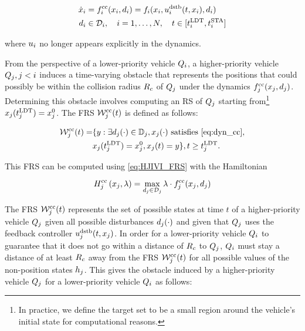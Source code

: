 \begin{equation}
\label{eq:dyn_cc}
\begin{aligned}
\dot \state_i &= \fdyn^\text{cc}_i (\state_i, \dstb_i) = \fdyn_i(\state_i, \ctrl^\text{dstb}_i(t,\state_i), \dstb_i) \\
\dstb_i &\in \dset_i, \quad i = 1,\ldots, N, \quad t \in [\ldt_i, \sta_i]
\end{aligned}
\end{equation}

\noindent where $u_i$ no longer appears explicitly in the dynamics.

From the perspective of a lower-priority vehicle $Q_i$, a higher-priority vehicle $Q_j, j < i$ induces a time-varying obstacle that represents the positions that could possibly be within the collision radius $R_c$ of $Q_j$ under the dynamics $f^\text{cc}_j(x_j, d_j)$. Determining this obstacle involves computing an RS of $Q_j$ starting from\footnote{In practice, we define the target set to be a small region around the vehicle's initial state for computational reasons.} $x_j(t^\text{LDT}_j) = x_{j}^0$. The FRS $\mathcal{W}_j^\text{cc}(t)$ is defined as follows:

\begin{equation}
\label{eq:FRS1}
\begin{aligned}
\frs_j^\text{cc}(t) = & \{y: \exists \dstb_j(\cdot) \in \dfset_j, \state_j(\cdot) \text{ satisfies \eqref{eq:dyn_cc}},\\
& \state_j(\ldt_j) = \state_{j}^0, \state_j(t) = y\}, t \geq \ldt_j.
\end{aligned}
\end{equation}

This FRS can be computed using \eqref{eq:HJIVI_FRS} with the Hamiltonian

\begin{equation}
H_j^\text{cc}\left(x_j, \lambda\right) = \max_{d_j \in \mathcal{D}_j} \lambda \cdot f^\text{cc}_j(x_j, d_j)
\end{equation}

The FRS $\mathcal{W}_j^\text{cc}(t)$ represents the set of possible states at time $t$ of a higher-priority vehicle $Q_j$ given all possible disturbances $d_j(\cdot)$ and given that $Q_j$ uses the feedback controller $u_j^\text{dstb}(t, x_j)$. In order for a lower-priority vehicle $Q_i$ to guarantee that it does not go within a distance of $R_c$ to $Q_j$, $Q_i$ must stay a distance of at least $R_c$ away from the FRS $\mathcal{W}_j^\text{cc}(t)$ for all possible values of the non-position states $h_j$. This gives the obstacle induced by a higher-priority vehicle $Q_j$ for a lower-priority vehicle $Q_i$ as follows:

